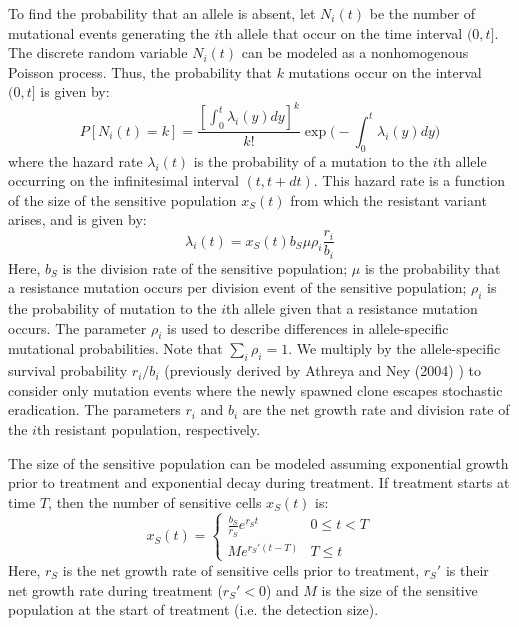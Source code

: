 \documentclass{article}
\begin{document}
To find the probability that an allele is absent, let $N_i(t)$ be the number of mutational events generating the $i$th allele that occur on the time interval $(0,t]$.  The discrete random variable $N_i(t)$ can be modeled as a nonhomogenous Poisson process.  Thus, the probability that $k$ mutations occur on the interval $(0,t]$ is given by:
\begin{equation}
P[N_i(t)=k] = \frac{[\int_0^t \lambda_i(y) dy]^k}{k!} \exp\Bigg(-\int_0^t \lambda_i(y) dy\Bigg)
\end{equation}
where the hazard rate $\lambda_i(t)$ is the probability of a mutation to the $i$th allele occurring on the infinitesimal interval $(t,t+dt)$.  This hazard rate is a function of the size of the sensitive population $x_S(t)$ from which the resistant variant arises, and is given by:
\begin{equation}
\lambda_i(t) = x_S(t) b_S \mu \rho_i \frac{r_i}{b_i}
\end{equation}
Here, $b_S$ is the division rate of the sensitive population; $\mu$ is the probability that a resistance mutation occurs per division event of the sensitive population; $\rho_i$ is the probability of mutation to the $i$th allele given that a resistance mutation occurs.  The parameter $\rho_i$ is used to describe differences in allele-specific mutational probabilities.  Note that $\sum_i \rho_i = 1$.  We multiply by the allele-specific survival probability $r_i/b_i$ (previously derived by Athreya and Ney (2004) \cite{1}) to consider only mutation events where the newly spawned clone escapes stochastic eradication.  The parameters $r_i$ and $b_i$ are the net growth rate and division rate of the $i$th resistant population, respectively.

The size of the sensitive population can be modeled assuming exponential growth prior to treatment and exponential decay during treatment.  If treatment starts at time $T$, then the number of sensitive cells $x_S(t)$ is:
\begin{equation}
x_S(t) = \begin{cases} 
          \frac{b_S}{r_S}e^{r_St} & 0\leq t < T \\
          Me^{r_S'(t-T)} & T\leq t
       \end{cases}
\end{equation}
Here, $r_S$ is the net growth rate of sensitive cells prior to treatment, $r_S'$ is their net growth rate during treatment ($r_S'<0$) and $M$ is the size of the sensitive population at the start of treatment (i.e. the detection size).
\end{document}
